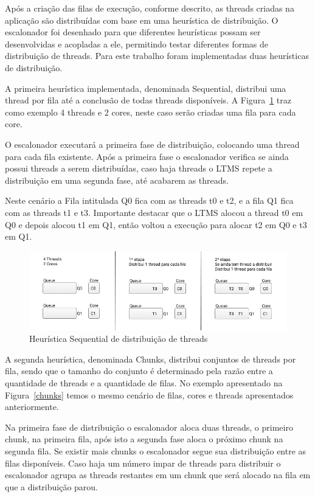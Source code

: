 \documentclass[diss,capa]{texufpel}
\begin{document}
Após a criação das filas de execução, conforme descrito, as threads criadas na aplicação são distribuídas com base em uma heurística de distribuição. O escalonador foi desenhado para que diferentes heurísticas possam ser desenvolvidas e acopladas a ele, permitindo testar diferentes formas de distribuição de threads. Para este trabalho foram implementadas duas heurísticas de distribuição.

A primeira heurística implementada, denominada Sequential, distribui uma thread por fila até a conclusão de todas threads disponíveis. A Figura~\ref{sequential} traz como exemplo 4 threads e 2 cores, neste caso serão criadas uma fila para cada core.

O escalonador executará a primeira fase de distribuição, colocando uma thread para cada fila existente. Após a primeira fase o escalonador verifica se ainda possui threads a serem distribuídas, caso haja threads o LTMS repete a distribuição em uma segunda fase, até acabarem as threads.

Neste cenário a Fila intitulada Q0 fica com as threads t0 e t2, e a fila Q1 fica com as threads t1 e t3. Importante destacar que o LTMS alocou a thread t0 em Q0 e depois alocou t1 em Q1, então voltou a execução para alocar t2 em Q0 e t3 em Q1.

\begin{figure}[htbp]
\centering
\includegraphics[scale=.6]{images/Queue_one.png}
\caption{Heurística Sequential de distribuição de threads}
\label{sequential}
\end{figure}

A segunda heurística, denominada Chunks, distribui conjuntos de threads por fila, sendo que o tamanho do conjunto é determinado pela razão entre a quantidade de threads e a quantidade de filas. No exemplo apresentado na Figura~\ref{chunks} temos o mesmo cenário de filas, cores e threads apresentados anteriormente.

Na primeira fase de distribuição o escalonador aloca duas threads, o primeiro chunk, na primeira fila, após isto a segunda fase aloca o próximo chunk na segunda fila. Se existir mais chunks o escalonador segue sua distribuição entre as filas disponíveis. Caso haja um número impar de threads para distribuir o escalonador agrupa as threads restantes em um chunk que será alocado na fila em que a distribuição parou.
\end{document}
